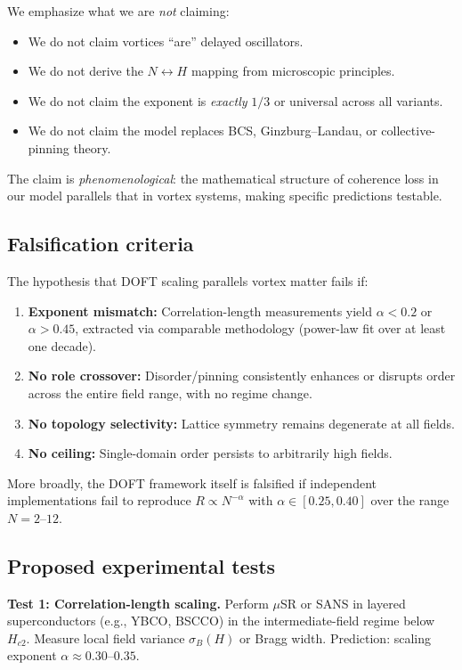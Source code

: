 \documentclass[reprint,aps,prb,superscriptaddress,floatfix]{revtex4-2}
\begin{document}
We emphasize what we are \emph{not} claiming:

\begin{itemize}
\item We do not claim vortices ``are'' delayed oscillators.
\item We do not derive the $N \leftrightarrow H$ mapping from microscopic principles.
\item We do not claim the exponent is \emph{exactly} $1/3$ or universal across all variants.
\item We do not claim the model replaces BCS, Ginzburg--Landau, or collective-pinning theory.
\end{itemize}

The claim is \emph{phenomenological}: the mathematical structure of coherence loss in our model parallels that in vortex systems, making specific predictions testable.

\subsection{Falsification criteria}

The hypothesis that DOFT scaling parallels vortex matter fails if:

\begin{enumerate}
\item \textbf{Exponent mismatch:} Correlation-length measurements yield $\alpha < 0.2$ or $\alpha > 0.45$, extracted via comparable methodology (power-law fit over at least one decade).
\item \textbf{No role crossover:} Disorder/pinning consistently enhances or disrupts order across the entire field range, with no regime change.
\item \textbf{No topology selectivity:} Lattice symmetry remains degenerate at all fields.
\item \textbf{No ceiling:} Single-domain order persists to arbitrarily high fields.
\end{enumerate}

More broadly, the DOFT framework itself is falsified if independent implementations fail to reproduce $R \propto N^{-\alpha}$ with $\alpha \in [0.25, 0.40]$ over the range $N = 2$--$12$.

\subsection{Proposed experimental tests}

\textbf{Test 1: Correlation-length scaling.} Perform $\mu$SR or SANS in layered superconductors (e.g., YBCO, BSCCO) in the intermediate-field regime below $H_{c2}$. Measure local field variance $\sigma_B(H)$ or Bragg width. Prediction: scaling exponent $\alpha \approx 0.30$--$0.35$.
\end{document}
